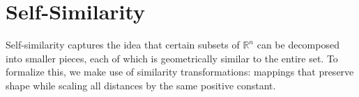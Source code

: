 \documentclass{article}
\theoremstyle{plain}
\newtheorem{thm}{Theorem}[section]
\theoremstyle{definition}
\newtheorem*{ex}{Example}
\DeclareMathOperator{\diam}{diam}
\theoremstyle{remark}
\begin{document}


    
\section{Self-Similarity}
Self-similarity captures the idea that certain subsets of $\mathbb{R}^n$ can be decomposed into smaller pieces, each of which is geometrically similar to the entire set. To formalize this, we make use of similarity transformations: mappings that preserve shape while scaling all distances by the same positive constant.
\end{document}
